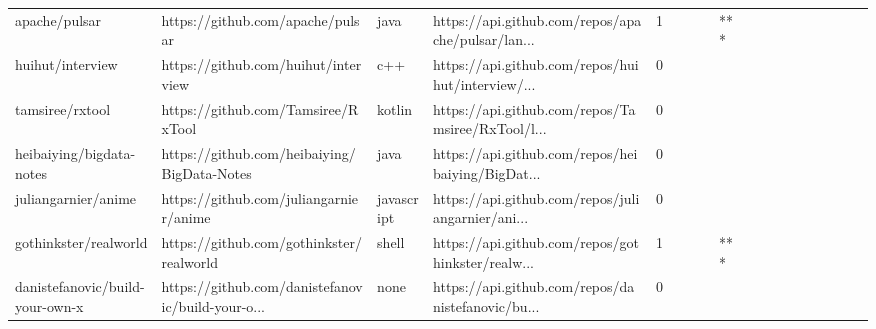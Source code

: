 \begin{tabular}{llllrlllllllllllll}
apache/pulsar                                      &                   https://github.com/apache/pulsar &              java &  https://api.github.com/repos/apache/pulsar/lan... &       1 &         &        &           &            *** &                 &        &           &           &          &          &       &              &          \\
huihut/interview                                   &                https://github.com/huihut/interview &               c++ &  https://api.github.com/repos/huihut/interview/... &       0 &         &        &           &                &                 &        &           &           &          &          &       &              &          \\
tamsiree/rxtool                                    &                 https://github.com/Tamsiree/RxTool &            kotlin &  https://api.github.com/repos/Tamsiree/RxTool/l... &       0 &         &        &           &                &                 &        &           &           &          &          &       &              &          \\
heibaiying/bigdata-notes                           &        https://github.com/heibaiying/BigData-Notes &              java &  https://api.github.com/repos/heibaiying/BigDat... &       0 &         &        &           &                &                 &        &           &           &          &          &       &              &          \\
juliangarnier/anime                                &             https://github.com/juliangarnier/anime &        javascript &  https://api.github.com/repos/juliangarnier/ani... &       0 &         &        &           &                &                 &        &           &           &          &          &       &              &          \\
gothinkster/realworld                              &           https://github.com/gothinkster/realworld &             shell &  https://api.github.com/repos/gothinkster/realw... &       1 &         &        &           &            *** &                 &        &           &           &          &          &       &              &          \\
danistefanovic/build-your-own-x                    &  https://github.com/danistefanovic/build-your-o... &              none &  https://api.github.com/repos/danistefanovic/bu... &       0 &         &        &           &                &                 &        &           &           &          &          &       &              &          \\

\end{tabular}

